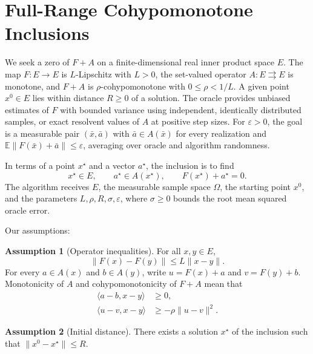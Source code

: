 \documentclass[10pt]{article}
\theoremstyle{definition}
\newtheorem{assumption}{Assumption}
\begin{document}
\section*{Full-Range Cohypomonotone Inclusions}
We seek a zero of $F+A$ on a finite-dimensional real inner product space $E$. The map $F:E\to E$ is $L$-Lipschitz with $L>0$, the set-valued operator $A:E\rightrightarrows E$ is monotone, and $F+A$ is $\rho$-cohypomonotone with $0\leq\rho<1/L$. A given point $x^0\in E$ lies within distance $R\geq0$ of a solution. The oracle provides unbiased estimates of $F$ with bounded variance using independent, identically distributed samples, or exact resolvent values of $A$ at positive step sizes. For $\varepsilon>0$, the goal is a measurable pair $(\bar{x},\bar{a})$ with $\bar{a}\in A(\bar{x})$ for every realization and $\mathbb{E}\|F(\bar{x})+\bar{a}\|\leq\varepsilon$, averaging over oracle and algorithm randomness.

In terms of a point $x^\star$ and a vector $a^\star$, the inclusion is to find
\[
x^\star\in E,\qquad a^\star\in A(x^\star),\qquad F(x^\star)+a^\star=0.
\]
The algorithm receives $E$, the measurable sample space $\Omega$, the starting point $x^0$, and the parameters $L,\rho,R,\sigma,\varepsilon$, where $\sigma\geq0$ bounds the root mean squared oracle error.

Our assumptions:
\begin{assumption}[Operator inequalities]
For all $x,y\in E$,
\[
\|F(x)-F(y)\|\leq L\|x-y\|.
\]
For every $a\in A(x)$ and $b\in A(y)$, write $u=F(x)+a$ and $v=F(y)+b$. Monotonicity of $A$ and cohypomonotonicity of $F+A$ mean that
\[
\begin{aligned}
\langle a-b,x-y\rangle &\geq 0,\\
\langle u-v,x-y\rangle &\geq -\rho\|u-v\|^2.
\end{aligned}
\]
\end{assumption}

\begin{assumption}[Initial distance]
There exists a solution $x^\star$ of the inclusion such that $\|x^0-x^\star\|\leq R$.
\end{assumption}
\end{document}
